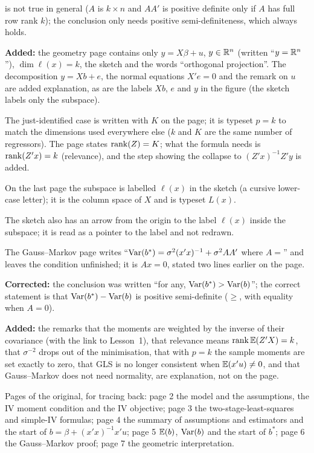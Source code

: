 \documentclass[11pt]{article}
\begin{document}
\begin{transcriptnotes}
        is not true in general ($A$ is $k\times n$ and $AA'$ is positive definite
        only if $A$ has full row rank $k$); the conclusion only needs positive
        semi-definiteness, which always holds.
  \item \textbf{Added:} the geometry page contains only $y=X\beta+u$,
        $y\in\mathbb{R}^n$ (written ``$y=\mathbb{R}^n$''), $\dim\ell(x)=k$, the sketch and the
        words ``orthogonal projection''. The decomposition $y=Xb+e$, the normal
        equations $X'e=0$ and the remark on $u$ are added explanation, as are the
        labels $Xb$, $e$ and $y$ in the figure (the sketch labels only the
        subspace).
  \item The just-identified case is written with $K$ on the page; it is typeset
        $p=k$ to match the dimensions used everywhere else ($k$ and $K$ are the
        same number of regressors). The page states
        $\operatorname{rank}(Z)=K$; what the formula needs is $\operatorname{rank}(Z'x)=k$ (relevance), and
        the step showing the collapse to $(Z'x)^{-1}Z'y$ is added.
  \item On the last page the subspace is labelled $\ell(x)$ in the sketch (a cursive
        lower-case letter); it is the column space of $X$ and is typeset $L(x)$.
  \item The sketch also has an arrow from the origin to the label $\ell(x)$
        inside the subspace; it is read as a pointer to the label and not redrawn.
  \item The Gauss--Markov page writes ``$\operatorname{Var}(b^{*})=\sigma^{2}(x'x)^{-1}+\sigma^{2}AA'$
        where $A=$'' and leaves the condition unfinished; it is $Ax=0$, stated
        two lines earlier on the page.
  \item \textbf{Corrected:} the conclusion was written ``for any,
        $\operatorname{Var}(b^{*})>\operatorname{Var}(b)$''; the correct statement is that
        $\operatorname{Var}(b^{*})-\operatorname{Var}(b)$ is positive semi-definite ($\ge$, with equality
        when $A=0$).
  \item \textbf{Added:} the remarks that the moments are weighted by the inverse
        of their covariance (with the link to Lesson~1), that relevance means
        $\operatorname{rank}\mathbb{E}(Z'X)=k$, that $\sigma^{-2}$ drops out of the minimisation, that
        with $p=k$ the sample moments are set exactly to zero, that GLS is no longer
        consistent when $\mathbb{E}(x'u)\ne0$, and that Gauss--Markov does not need
        normality, are explanation, not on the page.
  \item Pages of the original, for tracing back: page 2 the model and the
        assumptions, the IV moment condition and the IV objective; page 3 the two-stage-least-squares and simple-IV formulas;
        page 4 the summary of assumptions and estimators and the start of
        $b=\beta+(x'x)^{-1}x'u$; page 5 $\mathbb{E}(b)$,
        $\operatorname{Var}(b)$ and the start of $b^{*}$; page 6 the Gauss--Markov proof;
        page 7 the geometric interpretation.
\end{transcriptnotes}
\end{document}
